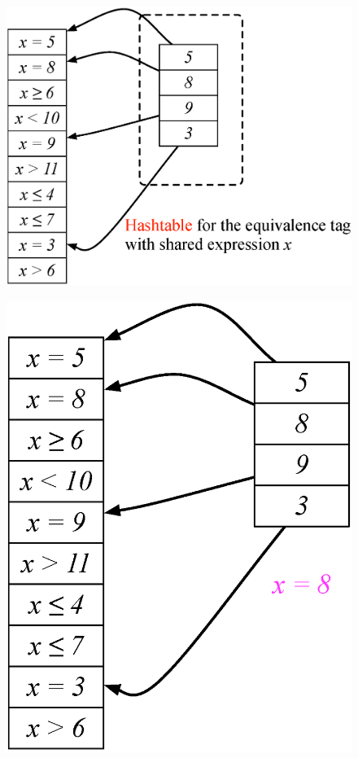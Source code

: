 \documentclass[mathserif,14pt,xcolor=table]{beamer}
\begin{document}
\begin{frame}
{\begin{figure}[ht!]
            \label{fig:fw}
        \end{figure}
    }
     {
        \begin{figure}[ht!]
            \centering
            \includegraphics[scale=0.50]{fig/tag_exp_2.eps}
            \label{fig:fw}
        \end{figure}
    }
     {
        \begin{figure}[ht!]
            \centering
            \includegraphics[scale=0.50]{fig/tag_exp_3.eps}

\end{figure}}
\end{frame}
\end{document}

